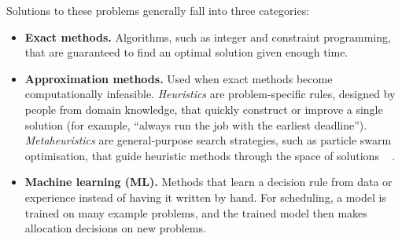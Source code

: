 \documentclass[12pt]{article}
\providecommand{\DIFaddtex}[1]{{\color{red}#1}} %
\providecommand{\DIFdeltex}[1]{} %
\providecommand{\DIFaddbegin}{} %
\providecommand{\DIFaddend}{} %
\providecommand{\DIFdelbegin}{} %
\providecommand{\DIFdelend}{} %
\providecommand{\DIFadd}[1]{\texorpdfstring{\DIFaddtex{#1}}{#1}} %
\providecommand{\DIFdel}[1]{\texorpdfstring{\DIFdeltex{#1}}{}} %
\providecommand{\DIFscaledelfig}{0.5}
\newlength{\DIFdelgraphicswidth} %
\newlength{\DIFdelgraphicsheight} %
\providecommand{\DIFaddincludegraphics}[2][]{{\color{blue}\fbox{\DIFOincludegraphics[#1]{#2}}}} %
\providecommand{\DIFdelincludegraphics}[2][]{%
\sbox{\DIFdelgraphicsbox}{\DIFOincludegraphics[#1]{#2}}%
\settoboxwidth{\DIFdelgraphicswidth}{\DIFdelgraphicsbox} %
\settoboxtotalheight{\DIFdelgraphicsheight}{\DIFdelgraphicsbox} %
\scalebox{\DIFscaledelfig}{%
\parbox[b]{\DIFdelgraphicswidth}{\usebox{\DIFdelgraphicsbox}\\[-\baselineskip] \rule{\DIFdelgraphicswidth}{0em}}\llap{\resizebox{\DIFdelgraphicswidth}{\DIFdelgraphicsheight}{%
\setlength{\unitlength}{\DIFdelgraphicswidth}%
\begin{picture}(1,1)%
\thicklines\linethickness{2pt} %
{\color[rgb]{1,0,0}\put(0,0){\framebox(1,1){}}}%
{\color[rgb]{1,0,0}\put(0,0){\line( 1,1){1}}}%
{\color[rgb]{1,0,0}\put(0,1){\line(1,-1){1}}}%
\end{picture}%
}\hspace*{3pt}}} %
} %
\DeclareRobustCommand{\DIFaddbegin}{\DIFOaddbegin \let\includegraphics\DIFaddincludegraphics} %
\DeclareRobustCommand{\DIFaddend}{\DIFOaddend \let\includegraphics\DIFOincludegraphics} %
\DeclareRobustCommand{\DIFdelbegin}{\DIFOdelbegin \let\includegraphics\DIFdelincludegraphics} %
\DeclareRobustCommand{\DIFdelend}{\DIFOaddend \let\includegraphics\DIFOincludegraphics} %
\begin{document}
\DIFaddend Solutions to these problems generally fall into three categories\DIFaddbegin \DIFadd{:
}\DIFaddend \begin{itemize}
    \item \textbf{Exact \DIFdelbegin \DIFdel{Methods}%
\DIFdel{. Algorithmsthat always solve a problem optimally
    }\DIFdelend \DIFaddbegin \DIFadd{methods.}} \DIFadd{Algorithms, such as integer and constraint programming, that are guaranteed to find an optimal solution given enough time.
    }\DIFaddend \item \DIFdelbegin \textbf{\DIFdel{Approximation Methods}}%
\DIFdel{. These methods are used when exact algorithms }\DIFdelend \DIFaddbegin \textbf{\DIFadd{Approximation methods.}} \DIFadd{Used when exact methods }\DIFaddend become computationally infeasible. \DIFdelbegin \DIFdel{Two main classes are heuristics which algorithms design to }\DIFdelend \DIFaddbegin \emph{\DIFadd{Heuristics}} \DIFadd{are problem-specific rules, designed by people from domain knowledge, that }\DIFaddend quickly construct or improve a single solution \DIFdelbegin \DIFdel{, and metaheuristics that are more higher-level and }\DIFdelend \DIFaddbegin \DIFadd{(for example, ``always run the job with the earliest deadline''). }\emph{\DIFadd{Metaheuristics}} \DIFadd{are general-purpose search strategies, such as particle swarm optimisation, that }\DIFaddend guide heuristic methods \DIFdelbegin \DIFdel{in a strategic manner \mbox{%
\cite{alkhalifa2025comparative}}\hskip0pt%
}\DIFdelend \DIFaddbegin \DIFadd{through the space of solutions \mbox{%
\cite{alkhalifa2025comparative}}\hskip0pt%
.
    }\DIFaddend \item \DIFdelbegin \textbf{\DIFdel{Machine learning}}%
\DIFdel{.
    Algorithms that are based on enforcing a set of rules to get the machine to learn on data
}\DIFdelend \DIFaddbegin \textbf{\DIFadd{Machine learning (ML).}} \DIFadd{Methods that learn a decision rule from data or experience instead of having it written by hand. For scheduling, a model is trained on many example problems, and the trained model then makes allocation decisions on new problems.
}\DIFaddend \end{itemize}
\end{document}
